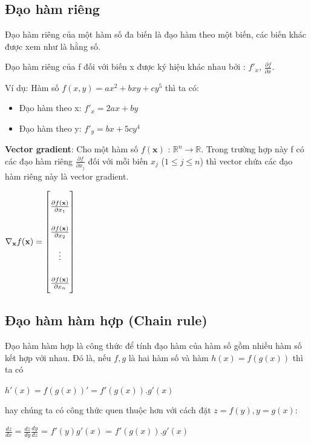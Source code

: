 \subsection{Đạo hàm riêng}
Đạo hàm riêng của một hàm số đa biến là đạo hàm theo một biến, các biến khác được xem như là hằng số. \par
Đạo hàm riêng của f đối với biến x được ký hiệu khác nhau bởi : ${  f'_x }$,  ${  \frac{\partial f}{\partial x} }.$\par
Ví dụ: Hàm số $f(x,y) = ax^2 + bxy + cy^5$ thì ta có:
\begin{itemize}
\setlength{\itemindent}{10mm}
	\item Đạo hàm theo x: ${  f'_x = 2ax +by}$
	\item Đạo hàm theo y: ${  f'_y = bx +5cy^4}$	
\end{itemize}

\textbf{Vector gradient}:
Cho một hàm số $f(\textbf{x})$ : $\mathbb{R}^n \rightarrow \mathbb{R}$. Trong trường hợp này f có các đạo hàm riêng $   \frac{\partial f}{\partial x_j}$ đối với mỗi biến $ x_j$ ($1\leq j \leq n$) thì vector chứa các đạo hàm riêng này là vector gradient.\par
\begin{center}

$ \nabla_\textbf{x}f(\textbf{x}) =
\renewcommand{\arraystretch}{2.5} 
\begin{bmatrix}

\frac{\partial f(\textbf{x})}{\partial x_1}\\ \frac{\partial f(\textbf{x})}{\partial x_2} \\ \vdots \\ \frac{\partial f(\textbf{x})}{\partial x_n}
\end{bmatrix}  $
\end{center}

\subsection{Đạo hàm hàm hợp (Chain rule)}

 Đạo hàm hàm hợp là công thức để tính đạo hàm của hàm số gồm nhiều hàm số kết hợp với nhau. Đó là, nếu $f, g$ là hai hàm số và hàm $h(x) = f(g(x))$ thì ta có 
\begin{center}
$h'(x) = f(g(x))' = f'(g(x)).g'(x) $

\end{center}
hay chúng ta có công thức quen thuộc hơn với cách đặt $z=f(y), y=g(x)$:
\begin{center}
$\frac{dz}{dx} = \frac{dz}{dy} \frac{dy}{dz}$ = $f'(y)g'(x)$ = $f'(g(x)).g'(x)$
\end{center}

